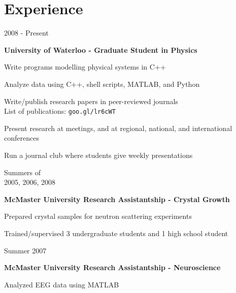 \documentclass[letterpaper]{article}
\renewenvironment{itemize}{
  \begin{list}{}{
    \setlength{\leftmargin}{1.5em}
  }
}{
  \end{list}
}
\begin{document}
\section*{Experience}
\begin{itemize}
\item 
	\begin{minipage}[t]{0.18\linewidth}
 	2008 - Present 
	\end{minipage}
	\begin{minipage}[t]{0.72\linewidth}
	{\bf University of Waterloo - Graduate Student in Physics}
		\begin{itemize}
		\item Write programs modelling physical systems in C++
		\item Analyze data using C++, shell scripts, MATLAB, and Python
		\item Write/publish research papers in peer-reviewed journals \\List of publications: {\tt goo.gl/lr6cWT}
		\item Present research at meetings, and at regional, national, and international conferences		
		\item Run a journal club where students give weekly presentations 
		\end{itemize}
\end{minipage}
\item 
	\begin{minipage}[t]{0.18\linewidth}
 	Summers of\\
	2005, 2006, 2008
	\end{minipage}
	\begin{minipage}[t]{0.77\linewidth}
	{\bf McMaster University Research Assistantship - Crystal Growth}
		\begin{itemize}
		\item Prepared crystal samples for neutron scattering experiments
		\item Trained/supervised 3 undergraduate students and 1 high school student
		\end{itemize}
\end{minipage}
\item 
	\begin{minipage}[t]{0.18\linewidth}
 	Summer 2007
	\end{minipage}
	\begin{minipage}[t]{0.72\linewidth}
	{\bf McMaster University Research Assistantship - Neuroscience}
		\begin{itemize}
		\item Analyzed EEG data using MATLAB
		\end{itemize}
\end{minipage}
\end{itemize}
\end{document}
